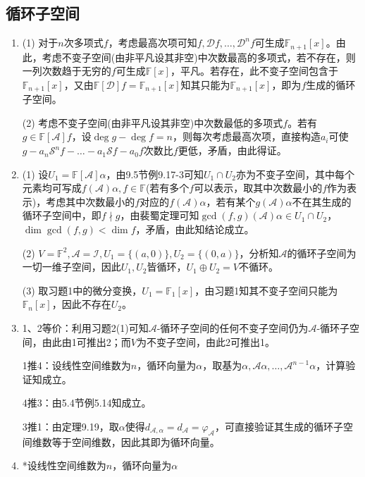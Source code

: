 \documentclass[a4paper,UTF8,fontset=windows]{ctexart}
\begin{document}
\subsection{循环子空间}
\begin{enumerate}
\item
(1) 对于$n$次多项式$f$，考虑最高次项可知$f,\mathcal{D}f,\dots,\mathcal{D}^nf$可生成$\mathbb{F}_{n+1}[x]$。由此，考虑不变子空间(由非平凡设其非空)中次数最高的多项式，若不存在，则一列次数趋于无穷的$f$可生成$\mathbb{F}[x]$，平凡。若存在，此不变子空间包含于$\mathbb{F}_{n+1}[x]$，又由$\mathbb{F}[\mathcal{D}]f=\mathbb{F}_{n+1}[x]$知其只能为$\mathbb{F}_{n+1}[x]$，即为$f$生成的循环子空间。

(2) 考虑不变子空间(由非平凡设其非空)中次数最低的多项式$f$。若有$g\in\mathbb{F}[\mathcal{A}]f$，设$\deg{g}-\deg{f}=n$，则每次考虑最高次项，直接构造$a_i$可使$g-a_n\mathcal{S}^nf-\dots-a_1\mathcal{S}f-a_0f$次数比$f$更低，矛盾，由此得证。

\item
(1) 设$U_1=\mathbb{F}[\mathcal{A}]\alpha$，由9.5节例9.17-3可知$U_1\cap U_2$亦为不变子空间，其中每个元素均可写成$f(\mathcal{A})\alpha,f\in\mathbb{F}$(若有多个$f$可以表示，取其中次数最小的$f$作为表示)，考虑其中次数最小的$f$对应的$f(\mathcal{A})\alpha$，若有某个$g(\mathcal{A})\alpha$不在其生成的循环子空间中，即$f\nmid g$，由裴蜀定理可知$\gcd(f,g)(\mathcal{A})\alpha\in U_1\cap U_2$，$\dim\gcd(f,g)<\dim f$，矛盾，由此知结论成立。

(2) $V=\mathbb{F}^2,\mathcal{A}=\mathcal{I},U_1=\{(a,0)\},U_2=\{(0,a)\}$，分析知$\mathcal{A}$的循环子空间为一切一维子空间，因此$U_1,U_2$皆循环，$U_1\oplus U_2=V$不循环。

(3) 取习题1中的微分变换，$U_1=\mathbb{F}_1[x]$，由习题1知其不变子空间只能为$\mathbb{F}_n[x]$，因此不存在$U_2$。

\item
1、2等价：利用习题2(1)可知$\mathcal{A}$-循环子空间的任何不变子空间仍为$\mathcal{A}$-循环子空间，由此由1可推出2；而$V$为不变子空间，由此2可推出1。

1推4：设线性空间维数为$n$，循环向量为$\alpha$，取基为$\alpha,\mathcal{A}\alpha,\dots,\mathcal{A}^{n-1}\alpha$，计算验证知成立。

4推3：由5.4节例5.14知成立。

3推1：由定理9.19，取$\alpha$使得$d_{\mathcal{A},\alpha}=d_\mathcal{A}=\varphi_\mathcal{A}$，可直接验证其生成的循环子空间维数等于空间维数，因此其即为循环向量。

\item
*设线性空间维数为$n$，循环向量为$\alpha$


\end{enumerate}
\end{document}
